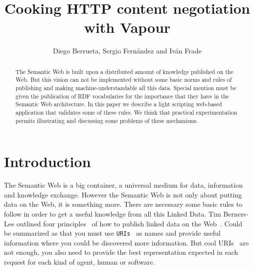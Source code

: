 \documentclass{../templates/llncs}
\begin{document}

\title{Cooking HTTP content negotiation with Vapour}



\author{Diego Berrueta, Sergio Fern\'andez and Iv\'an Frade}


\maketitle

\begin{abstract}
The Semantic Web is built upon a distributed amount of knowledge published on 
the Web. But this vision can not be implemented without some basic norms and 
rules of publishing and making machine-understandable all this data. Special 
mention must be given the publication of RDF vocabularies for the importance that
they have in the Semantic Web architecture. In this paper we describe a light 
scripting web-based application that validates some of these rules. We think 
that practical experimentation permits illustrating and discussing some
problems of these mechanisms.
\end{abstract}

\section{Introduction}

The Semantic Web is a big container, a universal medium for data, information
and knowledge exchange. However the Semantic Web is not only about putting data on
the Web, it is something more. There are necessary some basic rules to follow
in order to get a useful knowledge from all this Linked Data. Tim Berners-Lee %
outlined four principles~\cite{TimBL2006} of how to publish linked data on the 
Web~\cite{PublishLinkedData2007}. Could be summarized as that you must use 
\texttt{URIs}~\cite{RFC3986} as names and provide useful information where you 
could be discovered more information. But cool URIs~\cite{Sauermann2007} are 
not enough, you also need to provide the best representation expected in each
request for each kind of agent, human or software.
\end{document}

